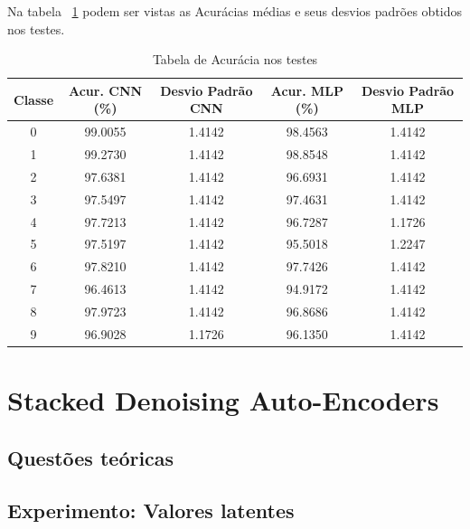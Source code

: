 \documentclass[12pt, a4paper, brazil, portuguese]{article}
\begin{document}
Na tabela ~\ref{tab:testes_um} podem ser vistas as Acurácias médias e seus desvios padrões obtidos
nos testes.
\begin{table}
  \begin{tabular}{ c c  c  c  c }
    Classe & Acur. CNN (\%) & Desvio Padrão CNN & Acur. MLP (\%) & Desvio Padrão MLP \\
    \hline
    0 & 99.0055 & 1.4142 & 98.4563 & 1.4142 \\
    1 & 99.2730 & 1.4142 & 98.8548 & 1.4142 \\
    2 & 97.6381 & 1.4142 & 96.6931 & 1.4142 \\
    3 & 97.5497 & 1.4142 & 97.4631 & 1.4142 \\
    4 & 97.7213 & 1.4142 & 96.7287 & 1.1726 \\
    5 & 97.5197 & 1.4142 & 95.5018 & 1.2247 \\
    6 & 97.8210 & 1.4142 & 97.7426 & 1.4142 \\
    7 & 96.4613 & 1.4142 & 94.9172 & 1.4142 \\
    8 & 97.9723 & 1.4142 & 96.8686 & 1.4142 \\
    9 & 96.9028 & 1.1726 & 96.1350 & 1.4142 \\
  \end{tabular}
  \caption{Tabela de Acurácia nos testes}
  \label{tab:testes_um}
\end{table}

































\section{Stacked Denoising Auto-Encoders}
\subsection{Questões teóricas}
\subsection{Experimento: Valores latentes}
\end{document}
